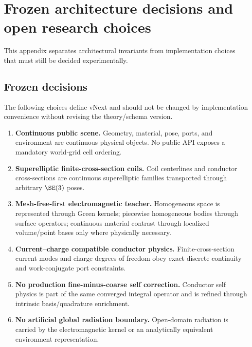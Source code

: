 \section{Frozen architecture decisions and open research choices}

This appendix separates architectural invariants from implementation choices that
must still be decided experimentally.

\subsection{Frozen decisions}

The following choices define vNext and should not be changed by implementation
convenience without revising the theory/schema version.

\begin{enumerate}
\item \textbf{Continuous public scene.}
  Geometry, material, pose, ports, and environment are continuous physical
  objects. No public API exposes a mandatory world-grid cell ordering.

\item \textbf{Superelliptic finite-cross-section coils.}
  Coil centerlines and conductor cross-sections are continuous superelliptic
  families transported through arbitrary $\SE(3)$ poses.

\item \textbf{Mesh-free-first electromagnetic teacher.}
  Homogeneous space is represented through Green kernels; piecewise homogeneous
  bodies through surface operators; continuous material contrast through
  localized volume/point bases only where physically necessary.

\item \textbf{Current--charge compatible conductor physics.}
  Finite-cross-section current modes and charge degrees of freedom obey exact
  discrete continuity and work-conjugate port constraints.

\item \textbf{No production fine-minus-coarse self correction.}
  Conductor self physics is part of the same converged integral operator and is
  refined through intrinsic basis/quadrature enrichment.

\item \textbf{No artificial global radiation boundary.}
  Open-domain radiation is carried by the electromagnetic kernel or an
  analytically equivalent environment representation.


\end{enumerate}
